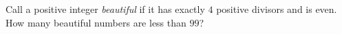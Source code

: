 Call a positive integer \emph{beautiful} if it has exactly $4$ positive divisors and is even. How many beautiful numbers are less than $99$?
